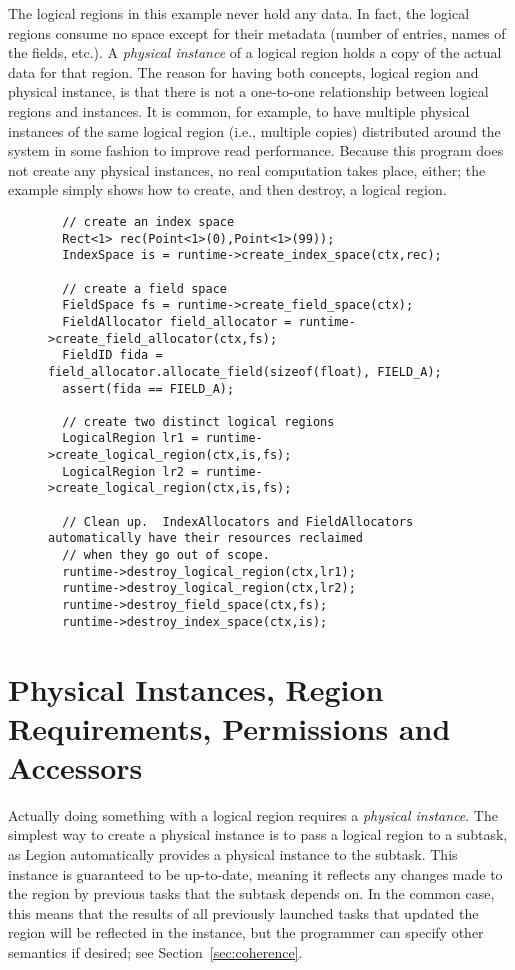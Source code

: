 The logical regions in this example never hold any data.  In
fact, the logical regions consume no space except for their metadata
(number of entries, names of the fields, etc.).  A {\em physical
  instance} of a logical region holds a copy of the actual data for
that region.  The reason for having both concepts, logical region and
physical instance, is that there is not a one-to-one relationship
between logical regions and instances.  It is common, for example, to
have multiple physical instances of the same logical region (i.e.,
multiple copies) distributed around the system in some fashion to
improve read performance.  Because this program does not create any
physical instances, no real computation takes place, either; the
example simply shows how to create, and then destroy, a logical
region.

\begin{figure}
{\small
\begin{lstlisting}
  // create an index space
  Rect<1> rec(Point<1>(0),Point<1>(99));
  IndexSpace is = runtime->create_index_space(ctx,rec);

  // create a field space                          
  FieldSpace fs = runtime->create_field_space(ctx);
  FieldAllocator field_allocator = runtime->create_field_allocator(ctx,fs);
  FieldID fida = field_allocator.allocate_field(sizeof(float), FIELD_A);
  assert(fida == FIELD_A);

  // create two distinct logical regions 
  LogicalRegion lr1 = runtime->create_logical_region(ctx,is,fs);
  LogicalRegion lr2 = runtime->create_logical_region(ctx,is,fs);

  // Clean up.  IndexAllocators and FieldAllocators automatically have their resources reclaimed
  // when they go out of scope. 
  runtime->destroy_logical_region(ctx,lr1);
  runtime->destroy_logical_region(ctx,lr2);
  runtime->destroy_field_space(ctx,fs);
  runtime->destroy_index_space(ctx,is);
\end{lstlisting}
}
\caption{}
\label{fig:lr1}
\end{figure}

\section{Physical Instances, Region Requirements, Permissions and Accessors}
\label{sec:permissions}

Actually doing something with a logical region requires a {\em
  physical instance}.  The simplest way to create a physical instance
is to pass a logical region to a subtask, as Legion automatically
provides a physical instance to the subtask.  This instance is
guaranteed to be up-to-date, meaning it reflects any changes made to
the region by previous tasks that the subtask depends on.  In the
common case, this means that the results of all previously launched
tasks that updated the region will be reflected in the instance, but
the programmer can specify other semantics if desired; see
Section~\ref{sec:coherence}.


